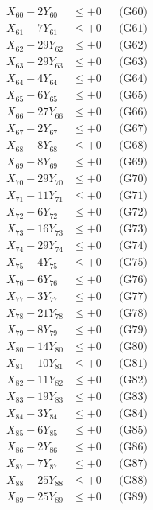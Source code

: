 \documentclass[a4paper,10pt]{article}
\begin{document}
{\begin{align}
X_{60} - 2Y_{60} &\leq +0 && \text{(G60)} \\
X_{61} - 7Y_{61} &\leq +0 && \text{(G61)} \\
X_{62} - 29Y_{62} &\leq +0 && \text{(G62)} \\
X_{63} - 29Y_{63} &\leq +0 && \text{(G63)} \\
\allowbreak
X_{64} - 4Y_{64} &\leq +0 && \text{(G64)} \\
X_{65} - 6Y_{65} &\leq +0 && \text{(G65)} \\
X_{66} - 27Y_{66} &\leq +0 && \text{(G66)} \\
X_{67} - 2Y_{67} &\leq +0 && \text{(G67)} \\
X_{68} - 8Y_{68} &\leq +0 && \text{(G68)} \\
X_{69} - 8Y_{69} &\leq +0 && \text{(G69)} \\
X_{70} - 29Y_{70} &\leq +0 && \text{(G70)} \\
X_{71} - 11Y_{71} &\leq +0 && \text{(G71)} \\
X_{72} - 6Y_{72} &\leq +0 && \text{(G72)} \\
X_{73} - 16Y_{73} &\leq +0 && \text{(G73)} \\
\allowbreak
X_{74} - 29Y_{74} &\leq +0 && \text{(G74)} \\
X_{75} - 4Y_{75} &\leq +0 && \text{(G75)} \\
X_{76} - 6Y_{76} &\leq +0 && \text{(G76)} \\
X_{77} - 3Y_{77} &\leq +0 && \text{(G77)} \\
X_{78} - 21Y_{78} &\leq +0 && \text{(G78)} \\
X_{79} - 8Y_{79} &\leq +0 && \text{(G79)} \\
X_{80} - 14Y_{80} &\leq +0 && \text{(G80)} \\
X_{81} - 10Y_{81} &\leq +0 && \text{(G81)} \\
X_{82} - 11Y_{82} &\leq +0 && \text{(G82)} \\
X_{83} - 19Y_{83} &\leq +0 && \text{(G83)} \\
\allowbreak
X_{84} - 3Y_{84} &\leq +0 && \text{(G84)} \\
X_{85} - 6Y_{85} &\leq +0 && \text{(G85)} \\
X_{86} - 2Y_{86} &\leq +0 && \text{(G86)} \\
X_{87} - 7Y_{87} &\leq +0 && \text{(G87)} \\
X_{88} - 25Y_{88} &\leq +0 && \text{(G88)} \\
X_{89} - 25Y_{89} &\leq +0 && \text{(G89)} \\

\end{align}}
\end{document}
